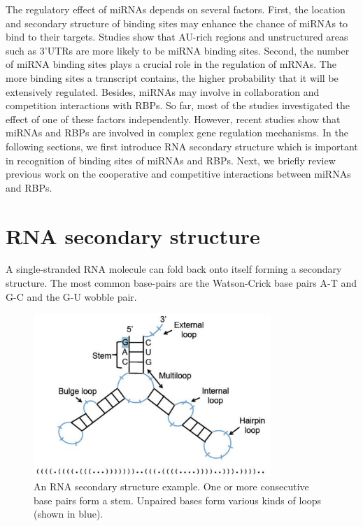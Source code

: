 The regulatory effect of miRNAs depends on several factors. First, the location and secondary structure of binding sites may enhance the chance of miRNAs to bind to their targets. Studies show that AU-rich regions and unstructured areas such as 3'UTRs are more likely to be miRNA binding sites. Second, the number of miRNA binding sites plays a crucial role in the regulation of mRNAs. The more binding sites a transcript contains, the higher probability that it will be extensively regulated. Besides, miRNAs may involve in collaboration and competition interactions with RBPs. So far, most of the studies investigated the effect of one of these factors independently. However, recent studies show that miRNAs and RBPs are involved in complex gene regulation mechanisms. In the following sections, we first introduce RNA secondary structure which is important in recognition of binding sites of miRNAs and RBPs. Next, we briefly review previous work on the cooperative and competitive interactions between miRNAs and RBPs.

\clearpage
\section{RNA secondary structure}

A single-stranded RNA molecule can fold back onto itself forming a secondary structure. The most common base-pairs are the Watson-Crick base pairs A-T and G-C and the G-U wobble pair.

\begin{figure}[H]
   \centering
   \includegraphics[width=0.8\textwidth,clip]{ch2_background/figures/secondary_structure}

\caption[Example of RNA Secondary Structure]{An RNA secondary structure example. One or more consecutive base pairs form a stem. Unpaired bases form various kinds of loops (shown in blue).}
\label{secondary_structure}
\end{figure}

